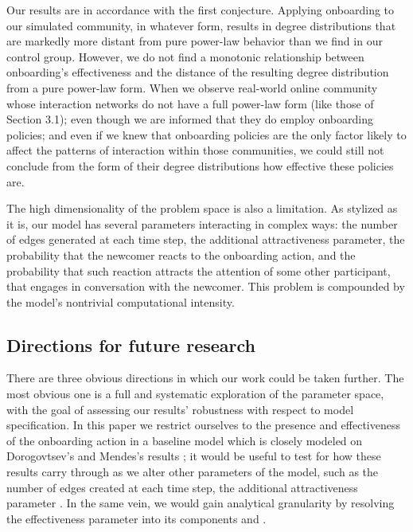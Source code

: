 Our results are in accordance with the first conjecture. Applying onboarding to our simulated community, in whatever form, results in degree distributions that are markedly more distant from pure power-law behavior than we find in our control group. However, we do not find a monotonic relationship between onboarding's effectiveness and the distance of the resulting degree distribution from a pure power-law form. When we observe real-world online community whose interaction networks do not have a full power-law form (like those of Section 3.1); even though we are informed that they do employ onboarding policies; and even if we knew that onboarding policies are the only factor likely to affect the patterns of interaction within those communities, we could still not conclude from the form of their degree distributions how effective these policies are. 

The high dimensionality of the problem space is also a limitation. As stylized as it is, our model has several parameters interacting in complex ways: the number of edges generated at each time step, the additional attractiveness parameter, the probability that the newcomer reacts to the onboarding action, and the probability that such reaction attracts the attention of some other participant, that engages in conversation with the newcomer. This problem is compounded by the model's nontrivial computational intensity. 

\subsection{Directions for future research}

There are three obvious directions in which our work could be taken further. The most obvious one is a full and systematic exploration of the parameter space, with the goal of assessing our results' robustness with respect to model specification. In this paper we restrict ourselves to the presence and effectiveness of the onboarding action in a baseline model which is closely modeled on Dorogovtsev's and Mendes's results \cite{dorogovtsev2002evolution}; it would be useful to test for how these results carry through as we alter other parameters of the model, such as the number of edges  created at each time step, the additional attractiveness parameter . In the same vein, we would gain analytical granularity by resolving the effectiveness parameter  into its components  and .

